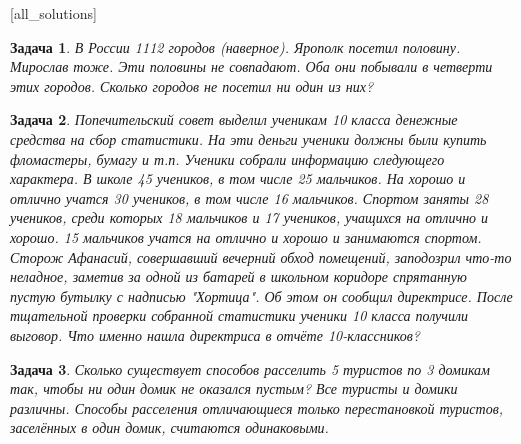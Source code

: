 \documentclass[12pt, a4paper]{article}
\newtheorem{problem}{Задача}
\begin{document}
[all_solutions]


\begin{problem}
В России 1112 городов (наверное). Ярополк посетил половину. Мирослав тоже. Эти половины не совпадают. Оба они побывали в четверти этих городов. Сколько городов не посетил ни один из них?
\begin{sol}

\end{sol}
\end{problem}



\begin{problem}
Попечительский совет выделил ученикам 10 класса денежные средства на сбор статистики. На эти деньги ученики должны были купить фломастеры, бумагу и т.п. Ученики собрали информацию следующего характера. В школе 45 учеников, в том числе 25 мальчиков. На хорошо и отлично учатся 30 учеников, в том числе 16 мальчиков. Спортом заняты 28 учеников, среди которых 18 мальчиков и 17 учеников, учащихся на отлично и хорошо. 15 мальчиков учатся на отлично и хорошо и занимаются спортом.
Сторож Афанасий, совершавший вечерний обход помещений, заподозрил что-то неладное, заметив за одной из батарей в школьном коридоре спрятанную пустую бутылку с надписью "Хортица". Об этом он сообщил директрисе. После тщательной проверки собранной статистики ученики 10 класса получили выговор. Что именно нашла директриса в отчёте 10-классников? 
\begin{sol}

\end{sol}
\end{problem}



\begin{problem}
Сколько существует способов расселить 5 туристов по 3 домикам так, чтобы ни один домик не оказался пустым? Все туристы и домики различны. Способы расселения отличающиеся только перестановкой туристов, заселённых в один домик, считаются одинаковыми.
\begin{sol}

\end{sol}
\end{problem}
\end{document}
